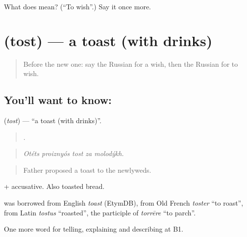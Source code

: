\begin{tcolorbox}[breakable,colback=teal!4,colframe=teal!35!black,title={Before you move on}]
What does  mean? (\textquotedblleft{}To wish\textquotedblright{}.) Say it once more.
\end{tcolorbox}
\section[\texorpdfstring{\ru{тост} (tost)}{тост (tost)}]{ (tost) — a toast (with drinks)}

\label{lesson:RU-C312-tost}



\begin{quote}
Before the new one: say the Russian for a wish, then the Russian for to wish.
\end{quote}

\subsection*{You'll want to know: }
\textbf{} (\emph{tost}) — \textquotedblleft{}a toast (with drinks)\textquotedblright{}.

\begin{quote}
    .
\end{quote}

\begin{quote}
\emph{Otéts proiznyós tost za molodýkh.}
\end{quote}

\begin{quote}
Father proposed a toast to the newlyweds.
\end{quote}

\emph{  } + accusative. Also toasted bread.

\begin{cousinweb}
\emph{} was borrowed from English \emph{toast} (EtymDB), from Old French \emph{toster} \textquotedblleft{}to roast\textquotedblright{}, from Latin \emph{tostus} \textquotedblleft{}roasted\textquotedblright{}, the participle of \emph{torrēre} \textquotedblleft{}to parch\textquotedblright{}.
\end{cousinweb}

\begin{grammarlens}[title={What you've built}]
One more word for telling, explaining and describing at B1.
\end{grammarlens}

